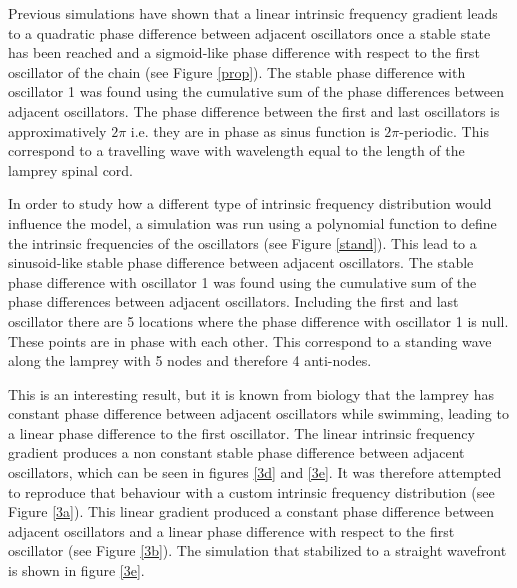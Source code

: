 \documentclass[a4paper]{scrartcl}
\begin{document}
Previous simulations have shown that a linear intrinsic frequency gradient leads to a quadratic phase difference between adjacent oscillators once a stable state has been reached and a sigmoid-like phase difference with respect to the first oscillator of the chain (see Figure \ref{prop}). The stable phase difference with oscillator 1 was found using the cumulative sum of the phase differences between adjacent oscillators. The phase difference between the first and last oscillators is approximatively $2\pi$ i.e. they are in phase as sinus function is $2\pi$-periodic. This correspond to a travelling wave with wavelength equal to the length of the lamprey spinal cord.

In order to study how a different type of intrinsic frequency distribution would influence the model, a simulation was run using a polynomial function to define the intrinsic frequencies of the oscillators (see Figure \ref{stand}). This lead to a sinusoid-like stable phase difference between adjacent oscillators. The stable phase difference with oscillator 1 was found using the cumulative sum of the phase differences between adjacent oscillators. Including the first and last oscillator there are 5 locations where the phase difference with oscillator 1 is null. These points are in phase with each other. This correspond to a standing wave along the lamprey with 5 nodes and therefore 4 anti-nodes.

This is an interesting result, but it is known from biology that the lamprey has constant phase difference between adjacent oscillators while swimming, leading to a linear phase difference to the first oscillator. The linear intrinsic frequency gradient produces a non constant stable phase difference between  adjacent oscillators, which can be seen in figures \ref{3d} and \ref{3e}. It was therefore attempted to reproduce that behaviour with a custom intrinsic frequency distribution (see Figure \ref{3a}). This linear gradient produced a constant phase difference between adjacent oscillators and a linear phase difference with respect to the first oscillator (see Figure \ref{3b}). The simulation that stabilized to a straight wavefront is shown in figure \ref{3e}.

\vspace{1cm}
\end{document}
